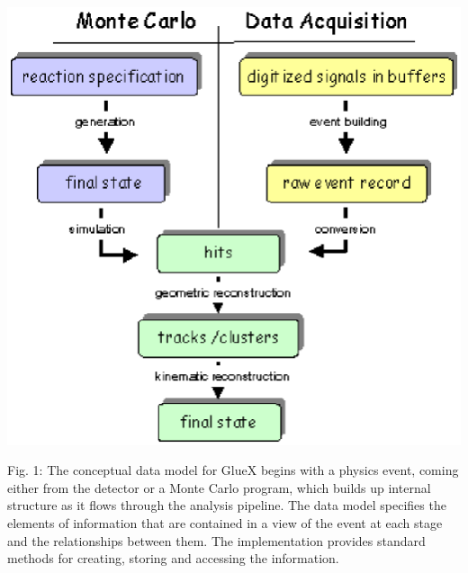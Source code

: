 \documentclass[10pt]{article}
\begin{document}
\begin{center}
\includegraphics[scale=1]{./dataflow.eps} 
\end{center}
 Fig. 1: The conceptual data model for GlueX begins with a physics event, coming either from the detector or a Monte Carlo program, which builds up internal structure as it flows through the analysis pipeline. The data model specifies the elements of information that are contained in a view of the event at each stage and the relationships between them. The implementation provides standard methods for creating, storing and accessing the information. 


 
\end{document}
